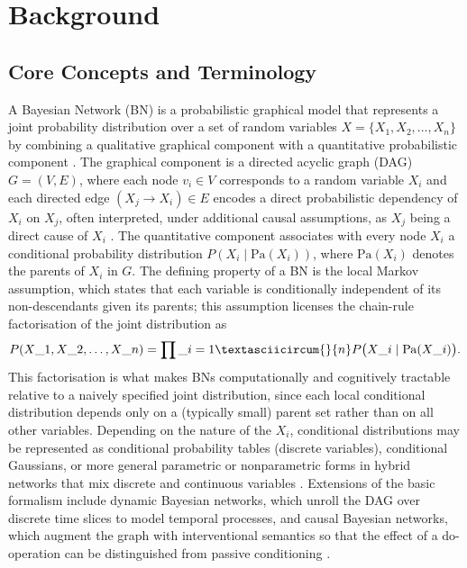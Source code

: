 \section{Background}\label{sec:background}
\subsection{Core Concepts and Terminology}
A Bayesian Network (BN) is a probabilistic graphical model that represents a joint probability distribution over a set of random variables $X = \{X_1, X_2, \dots, X_n\}$ by combining a qualitative graphical component with a quantitative probabilistic component \cite{bielza2014bayesian,zhou2011structure}. The graphical component is a directed acyclic graph (DAG) $G = (V, E)$, where each node $v_i \in V$ corresponds to a random variable $X_i$ and each directed edge $(X_j \rightarrow X_i) \in E$ encodes a direct probabilistic dependency of $X_i$ on $X_j$, often interpreted, under additional causal assumptions, as $X_j$ being a direct cause of $X_i$ \cite{kitson2023survey}. The quantitative component associates with every node $X_i$ a conditional probability distribution $P(X_i \mid \mathrm{Pa}(X_i))$, where $\mathrm{Pa}(X_i)$ denotes the parents of $X_i$ in $G$. The defining property of a BN is the local Markov assumption, which states that each variable is conditionally independent of its non-descendants given its parents; this assumption licenses the chain-rule factorisation of the joint distribution as
\begin{equation}
P(X\_1, X\_2, \dots, X\_n) = \prod\_{i=1}\textasciicircum{}{n} P\bigl(X\_i \mid \mathrm{Pa}(X\_i)\bigr).
\end{equation}
This factorisation is what makes BNs computationally and cognitively tractable relative to a naively specified joint distribution, since each local conditional distribution depends only on a (typically small) parent set rather than on all other variables. Depending on the nature of the $X_i$, conditional distributions may be represented as conditional probability tables (discrete variables), conditional Gaussians, or more general parametric or nonparametric forms in hybrid networks that mix discrete and continuous variables \cite{salmeron2018review}. Extensions of the basic formalism include dynamic Bayesian networks, which unroll the DAG over discrete time slices to model temporal processes, and causal Bayesian networks, which augment the graph with interventional semantics so that the effect of a do-operation can be distinguished from passive conditioning \cite{bielza2014bayesian,ebertuphoff2012causal}.

